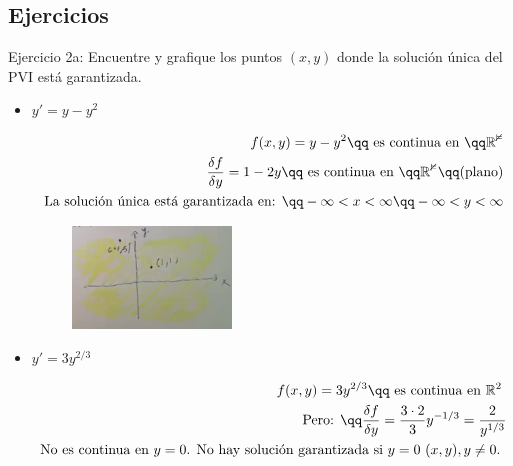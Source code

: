 \subsection{Ejercicios}
Ejercicio 2a: Encuentre y grafique los puntos $(x,y)$ donde la solución única del PVI está garantizada.
\begin{itemize}
    \item $\displaystyle y'=y-y^2$ 
        \begin{center}
           \begin{align*}
               f(x,y)=y-y^2 \qq \text{ es continua en } \qq \mathbb{R^2} \\ 
               \frac{\delta f}{\delta y} = 1-2y \qq \text{ es continua en } \qq \mathbb{R^2} \qq \text{(plano)} \\ 
               \text{ La solución única está garantizada en: } \qq -\infty<x<\infty \qq -\infty<y<\infty \\ 
           \end{align*}
           \begin{figure}[H]
               \centering
               \includegraphics[width=0.4\textwidth]{./Figs/2021-01-13-10-35-55.png}
           \end{figure}
        \end{center}
    
    \item $\displaystyle y'=3y^{2/3}$ 
        \begin{center}
           \begin{align*}
               f(x,y)=3y^{2/3} \qq \text{ es continua en $\mathbb{R}^2$ } \\ 
               \text{ Pero: } \qq \frac{\delta f}{\delta y} = \frac{3\cdot 2}{3}y^{-1/3} = \frac{2}{y^{1/3}} \\ 
               \text{ No es continua en $y=0$. No hay solución garantizada si $y=0$ $(x,y), y\neq 0$. } \\ 
           \end{align*}
        \end{center}
    

\end{itemize}
